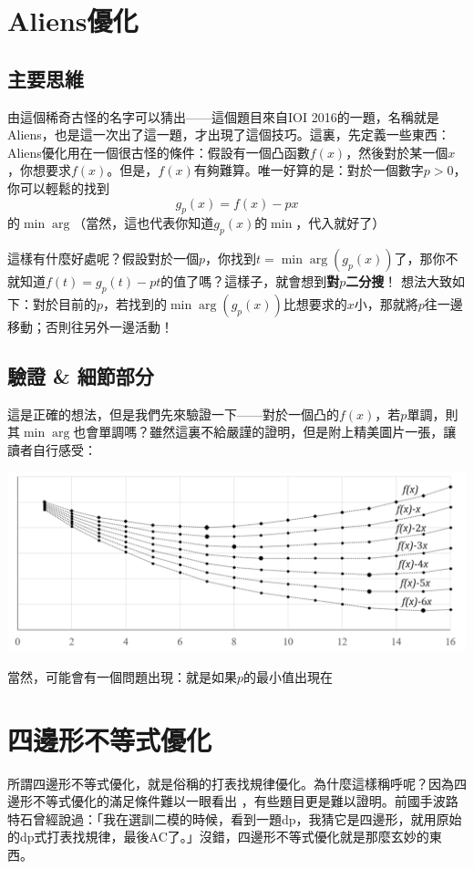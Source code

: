 \documentclass[main.tex]{subfiles}
\begin{document}
\section{Aliens優化}
	\subsection{主要思維}
		由這個稀奇古怪的名字可以猜出——這個題目來自IOI 2016的一題，名稱就是Aliens，也是這一次出了這一題，才出現了這個技巧。這裏，先定義一些東西：
		Aliens優化用在一個很古怪的條件：假設有一個凸函數$f(x)$，然後對於某一個$x$，你想要求$f(x)$。但是，$f(x)$有夠難算。唯一好算的是：對於一個數字$p > 0$，你可以輕鬆的找到
		$$g_p(x) = f(x) - px$$
		的$\min\arg$（當然，這也代表你知道$g_p(x)$的$\min$，代入就好了）
		
		這樣有什麼好處呢？假設對於一個$p$，你找到$t = \min \arg(g_p(x))$了，那你不就知道$f(t) = g_p(t) - pt$的值了嗎？這樣子，就會想到\textbf{對$p$二分搜}！
			想法大致如下：對於目前的$p$，若找到的$\min\arg(g_p(x))$比想要求的$x$小，那就將$p$往一邊移動；否則往另外一邊活動！
	\subsection{驗證 \& 細節部分}
		這是正確的想法，但是我們先來驗證一下——對於一個凸的$f(x)$，若$p$單調，則其$\min\arg$也會單調嗎？雖然這裏不給嚴謹的證明，但是附上精美圖片一張，讓讀者自行感受：
		\begin{center}
			\includegraphics{images/aliensopt}
		\end{center}
		當然，可能會有一個問題出現：就是如果$p$的最小值出現在
	\section{四邊形不等式優化}
	
	所謂四邊形不等式優化，就是俗稱的打表找規律優化。為什麼這樣稱呼呢？因為四邊形不等式優化的滿足條件難以一眼看出  ，有些題目更是難以證明。前國手波路特石曾經說過：「我在選訓二模的時候，看到一題dp，我猜它是四邊形，就用原始的dp式打表找規律，最後AC了。」沒錯，四邊形不等式優化就是那麼玄妙的東西。
	
\end{document}
